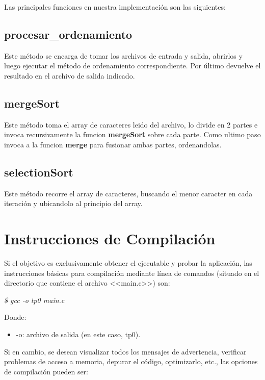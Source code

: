 \documentclass[a4paper,10pt]{article}
\begin{document}
Las principales funciones en nuestra implementación son las siguientes:

\subsection{procesar\_ordenamiento}
Este método se encarga de tomar los archivos de entrada y salida, abrirlos y luego ejecutar el método de ordenamiento correspondiente.
Por último devuelve el resultado en el archivo de salida indicado.

\subsection{mergeSort}
Este método toma el array de caracteres leido del archivo, lo divide en 2 partes e invoca recursivamente la funcion \textbf{mergeSort} sobre cada parte.
Como ultimo paso invoca a la funcion \textbf{merge} para fusionar ambas partes, ordenandolas.

\subsection{selectionSort}
Este método recorre el array de caracteres, buscando el menor caracter en cada iteración y ubicandolo al principio del array.

\section{Instrucciones de Compilación}

Si el objetivo es exclusivamente obtener el ejecutable y probar la aplicación, las instrucciones básicas para compilación mediante línea de comandos (situado en el directorio que contiene el archivo <<main.c>>) son:\\

\begin{center}
\textit{\$ gcc -o tp0 main.c}\\
\end{center}

Donde:
\begin{itemize}
\item -o: archivo de salida (en este caso, tp0).
\end{itemize}

Si en cambio, se desean visualizar todos los mensajes de advertencia, verificar problemas de acceso a memoria, depurar el código, optimizarlo, etc., las opciones de compilación pueden ser:\\
\end{document}
